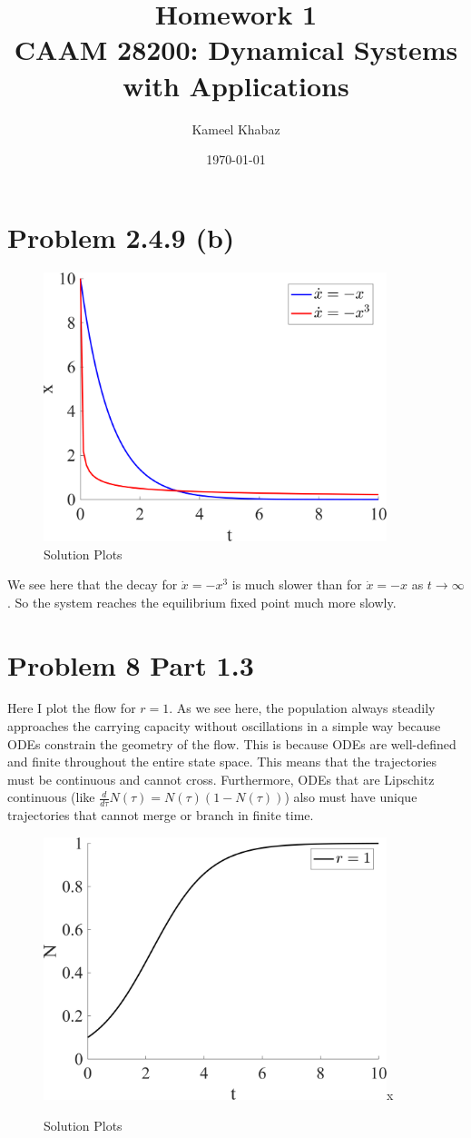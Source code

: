 \documentclass[11pt]{article}
\title{Homework 1 \large \\ CAAM 28200: Dynamical Systems with Applications}
\author{Kameel Khabaz}
\date{\today}
\begin{document}
\maketitle

\section*{Problem 2.4.9 (b)}
\begin{figure}[h]
\centering
\includegraphics[width=10cm]{2_4_9_c}
\caption{Solution Plots}
\end{figure}
We see here that the decay for $\dot{x} = -x^3$ is much slower than for $\dot{x} = -x$ as $t \rightarrow \infty$. So the system reaches the equilibrium fixed point much more slowly.

\section*{Problem 8 Part 1.3}
Here I plot the flow for $ r = 1$. As we see here, the population always steadily approaches the carrying capacity without oscillations in a simple way because ODEs constrain the geometry of the flow. This is because ODEs are well-defined and finite throughout the entire state space. This means that the trajectories must be continuous and cannot cross. Furthermore, ODEs that are Lipschitz continuous (like $\frac{d}{d \tau} N(\tau) = N(\tau)(1- N(\tau))$) also must have unique trajectories that cannot merge or branch in finite time.


\begin{figure}[h]
\centering
\includegraphics[width=10cm]{8_p1_3}x
\caption{Solution Plots}
\end{figure}
\end{document}
